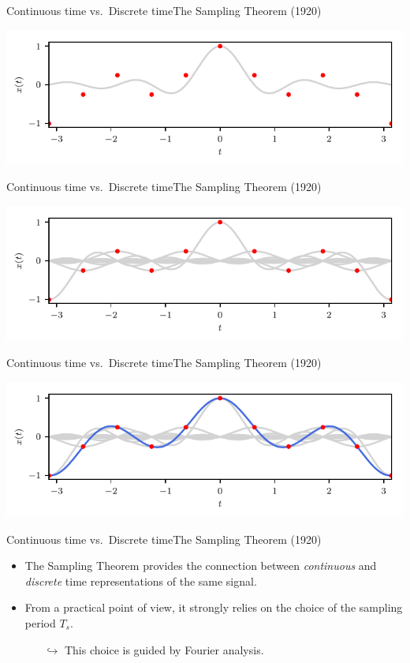 \documentclass[usenames,dvipsnames,svgnames,10pt,aspectratio=169]{beamer}
\begin{document}
\begin{frame}[t, c]{Continuous time vs.\ Discrete time}{The Sampling Theorem (1920)}
	\addtocounter{framenumber}{-1}
	\centering
	\includegraphics[width=.75\textwidth]{Sampling_theorem_d}
\end{frame}

\begin{frame}[t, c]{Continuous time vs.\ Discrete time}{The Sampling Theorem (1920)}
	\addtocounter{framenumber}{-1}
	\centering
	\includegraphics[width=.75\textwidth]{Sampling_theorem_e}
\end{frame}

\begin{frame}[t, c]{Continuous time vs.\ Discrete time}{The Sampling Theorem (1920)}
	\addtocounter{framenumber}{-1}
	\centering
	\includegraphics[width=.75\textwidth]{Sampling_theorem_f}
\end{frame}

\begin{frame}[t, c]{Continuous time vs.\ Discrete time}{The Sampling Theorem (1920)}
	\begin{itemize}
		\item The Sampling Theorem provides the connection between \emph{continuous} and \emph{discrete} time representations of the same signal.

		\bigskip

		\item From a practical point of view, it strongly relies on the choice of the sampling period $T_s$.
		\begin{itemize}
			\item[$\hookrightarrow$] This choice is guided by Fourier analysis.
		\end{itemize}
	\end{itemize}
	\vspace{1cm}
\end{frame}
\end{document}
